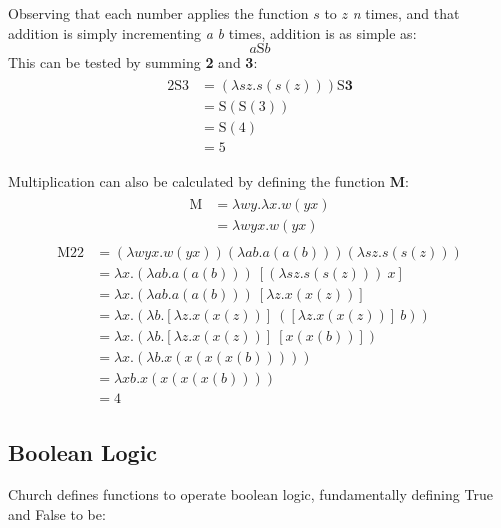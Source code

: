 \documentclass[Master.tex]{subfiles}
\begin{document}
Observing that each number applies the function $s$ to $z$ \textit{n} times, and that addition is simply incrementing \textit{a} \textit{b} times, addition is as simple as:
\cite{rojas2015lambdatutorial}
\begin{equation*}
a\bm{\mathrm{S}}b	
\end{equation*}
This can be tested by summing \textbf{2} and \textbf{3}:
\begin{gather*}
\begin{aligned}
\bm{\mathrm{2S3}} &= (\lambda sz.s(s(z))) \bm{\mathrm{S}} \bm{\textrm{3}}\\
&= \bm{\mathrm{S}} (\bm{\mathrm{S}} (\bm{\mathrm{3}}))\\
&= \bm{\mathrm{S}} (\bm{\mathrm{4}})\\
&= \bm{\mathrm{5}}
\end{aligned}
\end{gather*}

Multiplication can also be calculated by defining the function \textbf{M}:
\cite{rojas2015lambdatutorial}
\begin{gather*}
\begin{aligned}
\bm{\mathrm{M}} &= \lambda wy.\lambda x.w(yx) \\
&= \lambda wyx.w(yx)
\end{aligned}
\end{gather*}  
\begin{gather*}
\begin{aligned}
\bm{\mathrm{M22}} &= (\lambda wyx.w(yx))(\lambda ab.a(a(b)))(\lambda sz.s(s(z)))\\
&= \lambda x.(\lambda ab.a(a(b)))\ [(\lambda sz.s(s(z)))\ x]\\
&= \lambda x.(\lambda ab.a(a(b)))\ [\lambda z.x(x(z))]\\
&= \lambda x.(\lambda b.[\lambda z.x(x(z))]\ ([\lambda z.x(x(z))]\ b))\\
&= \lambda x.(\lambda b.[\lambda z.x(x(z))]\ [x(x(b))])\\
&= \lambda x.(\lambda b.x(x(x(x(b)))))\\
&= \lambda xb.x(x(x(x(b))))\\
&= \bm{\mathrm{4}}
\end{aligned}
\end{gather*}

\subsection{Boolean Logic}

Church defines functions to operate boolean logic, fundamentally defining True and False to be:
\cite{rojas2015lambdatutorial}
    
\end{document}
